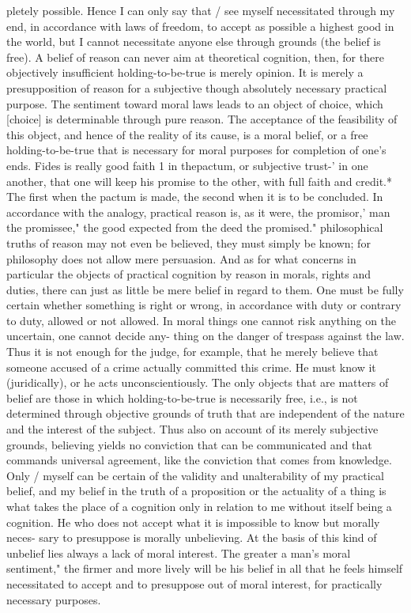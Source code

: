 pletely possible. Hence I can only say that / see myself necessitated through my end, in
accordance with laws of freedom, to accept as possible a highest good in the world, but I
cannot necessitate anyone else through grounds (the belief is free).
A belief of reason can never aim at theoretical cognition, then, for there objectively
insufficient holding-to-be-true is merely opinion. It is merely a presupposition of reason for
a subjective though absolutely necessary practical purpose. The sentiment toward moral
laws leads to an object of choice, which [choice] is determinable through pure reason. The
acceptance of the feasibility of this object, and hence of the reality of its cause, is a moral
belief, or a free holding-to-be-true that is necessary for moral purposes for completion of
one's ends.
Fides is really good faith 1 in thepactum, or subjective trust-' in one another, that one will keep
his promise to the other, with full faith and credit.* The first when the pactum is made, the
second when it is to be concluded.
In accordance with the analogy, practical reason is, as it were, the promisor,' man the
promissee," the good expected from the deed the promised."
philosophical truths of reason may not even be believed, they must simply
be known; for philosophy does not allow mere persuasion. And as for
what concerns in particular the objects of practical cognition by reason in
morals, rights and duties, there can just as little be mere belief in regard to
them. One must be fully certain whether something is right or wrong, in
accordance with duty or contrary to duty, allowed or not allowed. In moral
things one cannot risk anything on the uncertain, one cannot decide any-
thing on the danger of trespass against the law. Thus it is not enough for the
judge, for example, that he merely believe that someone accused of a crime
actually committed this crime. He must know it (juridically), or he acts
unconscientiously.
 The only objects that are matters of belief are those in which
holding-to-be-true is necessarily free, i.e., is not determined through
objective grounds of truth that are independent of the nature and the
interest of the subject.
Thus also on account of its merely subjective grounds, believing yields
no conviction that can be communicated and that commands universal
agreement, like the conviction that comes from knowledge. Only / myself
can be certain of the validity and unalterability of my practical belief, and
my belief in the truth of a proposition or the actuality of a thing is what
takes the place of a cognition only in relation to me without itself being a
cognition.
He who does not accept what it is impossible to know but morally neces-
sary to presuppose is morally unbelieving. At the basis of this kind of
unbelief lies always a lack of moral interest. The greater a man's moral
sentiment," the firmer and more lively will be his belief in all that he feels
himself necessitated to accept and to presuppose out of moral interest, for
practically necessary purposes.

